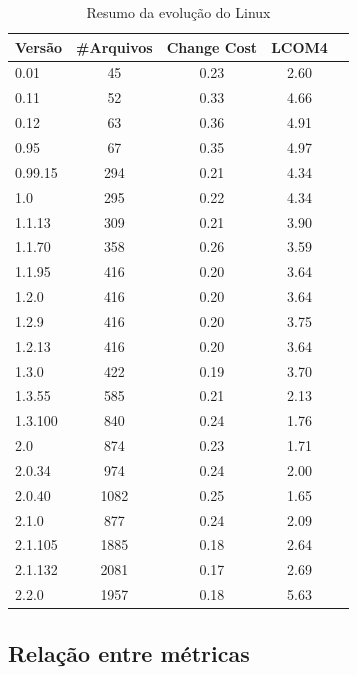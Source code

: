 \documentclass[conference]{IEEEtran}
\begin{document}
\begin{table}
\caption{Resumo da evolução do Linux}
\centering
\begin{tabular}{| l | c | c | c | c |}
\hline
Versão    & \#Arquivos & Change Cost & LCOM4  \\
\hline
0.01      & 45         & 0.23        & 2.60   \\
0.11      & 52         & 0.33        & 4.66   \\
0.12      & 63         & 0.36        & 4.91   \\
0.95      & 67         & 0.35        & 4.97   \\
0.99.15   & 294        & 0.21        & 4.34   \\
1.0       & 295        & 0.22        & 4.34   \\
1.1.13    & 309        & 0.21        & 3.90   \\
1.1.70    & 358        & 0.26        & 3.59   \\
1.1.95    & 416        & 0.20        & 3.64   \\
1.2.0     & 416        & 0.20        & 3.64   \\
1.2.9     & 416        & 0.20        & 3.75   \\
1.2.13    & 416        & 0.20        & 3.64   \\
1.3.0     & 422        & 0.19        & 3.70   \\
1.3.55    & 585        & 0.21        & 2.13   \\
1.3.100   & 840        & 0.24        & 1.76   \\
2.0       & 874        & 0.23        & 1.71   \\
2.0.34    & 974        & 0.24        & 2.00   \\
2.0.40    & 1082       & 0.25        & 1.65   \\
2.1.0     & 877        & 0.24        & 2.09   \\
2.1.105   & 1885       & 0.18        & 2.64   \\
2.1.132   & 2081       & 0.17        & 2.69   \\
2.2.0     & 1957       & 0.18        & 5.63   \\
\hline
\end{tabular}
\label{tab:resumo}
\end{table}

\subsection{Relação entre métricas}
\end{document}
